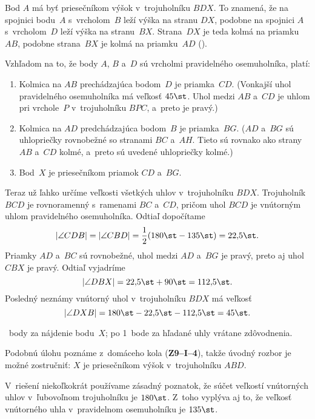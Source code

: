 {%
Bod $A$ má byť priesečníkom výšok v~trojuholníku $BDX$.
To znamená, že na spojnici bodu~$A$ s~vrcholom~$B$ leží výška na stranu
$DX$, podobne na spojnici $A$ s~vrcholom~$D$ leží výška na stranu~$BX$.
Strana~$DX$ je teda kolmá na priamku~$AB$, podobne strana~$BX$ je kolmá na
priamku~$AD$ (\obr).
%

Vzhľadom na to, že body $A$, $B$ a~$D$ sú vrcholmi pravidelného
osemuholníka, platí:
\begin{enumerate}
  \item Kolmica na $AB$ prechádzajúca bodom~$D$ je priamka~$CD$.
    (Vonkajší uhol pravidelného osemuholníka má veľkosť $45\st$.
    Uhol medzi $AB$ a~$CD$ je uhlom pri vrchole~$P$ v~trojuholníku $BPC$, a~preto je pravý.)
  \item Kolmica na $AD$ predchádzajúca bodom~$B$ je priamka~$BG$.
    ($AD$ a~$BG$ sú uhlopriečky rovnobežné so stranami $BC$ a~$AH$.
    Tieto sú rovnako ako strany $AB$ a~$CD$ kolmé, a~preto sú uvedené
    uhlopriečky kolmé.)
  \item Bod~$X$ je priesečníkom priamok $CD$ a~$BG$.
\end{enumerate}

Teraz už ľahko určíme veľkosti všetkých uhlov v~trojuholníku $BDX$.
Trojuholník $BCD$ je rovnoramenný s~ramenami $BC$ a~$CD$, pričom uhol $BCD$
je vnútorným uhlom pravidelného osemuholníka.
Odtiaľ dopočítame
$$
|\angle CDB|=|\angle CBD|=\frac12(180\st-135\st)=22{,}5\st.
$$
Priamky $AD$ a~$BC$ sú rovnobežné, uhol medzi $AD$ a~$BG$ je pravý, preto
aj uhol $CBX$ je pravý.
Odtiaľ vyjadríme
$$
|\angle DBX|=22{,}5\st+90\st=112{,}5\st.
$$
Posledný neznámy vnútorný uhol v~trojuholníku $BDX$ má veľkosť
$$
|\angle DXB|=180\st-22{,}5\st-112{,}5\st=45\st.
$$

~body za nájdenie bodu~$X$; po 1~bode za hľadané uhly vrátane zdôvodnenia.

\poznamka
Podobnú úlohu poznáme z~domáceho kola ({\bf Z9--I--4}), takže úvodný
rozbor je možné zostručniť: $X$ je priesečníkom výšok v~trojuholníku $ABD$.

V~riešení niekoľkokrát používame zásadný poznatok, že súčet veľkostí
vnútorných uhlov v~ľubovoľnom trojuholníku je $180\st$.
Z~toho vyplýva aj to, že veľkosť vnútorného uhla v~pravidelnom osemuholníku
je $135\st$.
\endhodnotenie
}

